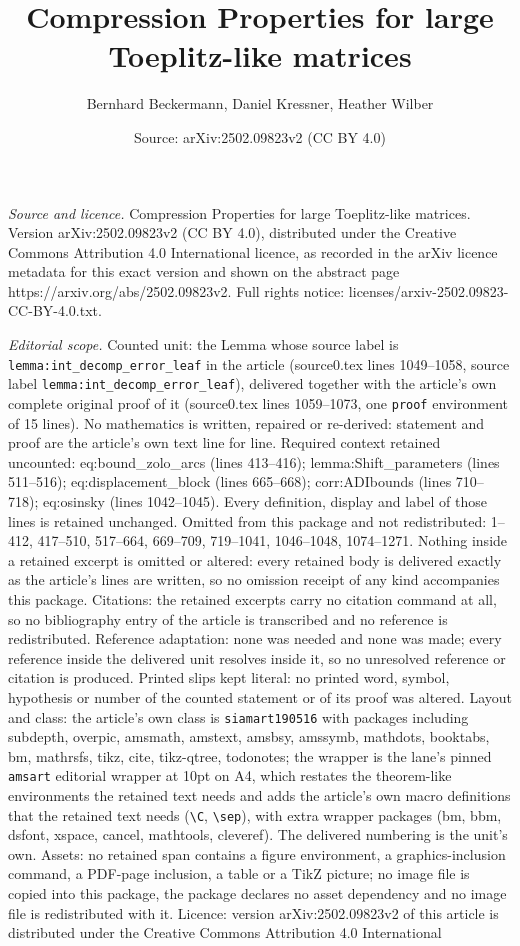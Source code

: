 \documentclass[10pt,a4paper]{amsart}
\title[Compression Properties for large Toeplitz-like matrices]{Compression Properties for large Toeplitz-like matrices}
\author{Bernhard Beckermann, Daniel Kressner, Heather Wilber}
\date{Source: arXiv:2502.09823v2 (CC BY 4.0)}
\begin{document}
\maketitle

\noindent\emph{Source and licence.} Compression Properties for large Toeplitz-like matrices. Version arXiv:2502.09823v2 (CC BY 4.0), distributed under the Creative Commons Attribution 4.0 International licence, as recorded in the arXiv licence metadata for this exact version and shown on the abstract page https://arxiv.org/abs/2502.09823v2. Full rights notice: licenses/arxiv-2502.09823-CC-BY-4.0.txt.\par\smallskip

\noindent\textit{Editorial scope.} Counted unit: the Lemma whose source label is \texttt{lemma:int\_decomp\_error\_leaf} in the article (source0.tex lines 1049--1058, source label \texttt{lemma:int\_decomp\_error\_leaf}), delivered together with the article's own complete original proof of it (source0.tex lines 1059--1073, one \texttt{proof} environment of 15 lines). No mathematics is written, repaired or re-derived: statement and proof are the article's own text line for line. Required context retained uncounted: eq:bound\_zolo\_arcs (lines 413--416); lemma:Shift\_parameters (lines 511--516); eq:displacement\_block (lines 665--668); corr:ADIbounds (lines 710--718); eq:osinsky (lines 1042--1045). Every definition, display and label of those lines is retained unchanged. Omitted from this package and not redistributed: 1--412, 417--510, 517--664, 669--709, 719--1041, 1046--1048, 1074--1271. Nothing inside a retained excerpt is omitted or altered: every retained body is delivered exactly as the article's lines are written, so no omission receipt of any kind accompanies this package. Citations: the retained excerpts carry no citation command at all, so no bibliography entry of the article is transcribed and no reference is redistributed. Reference adaptation: none was needed and none was made; every reference inside the delivered unit resolves inside it, so no unresolved reference or citation is produced. Printed slips kept literal: no printed word, symbol, hypothesis or number of the counted statement or of its proof was altered. Layout and class: the article's own class is \texttt{siamart190516} with packages including subdepth, overpic, amsmath, amstext, amsbsy, amssymb, mathdots, booktabs, bm, mathrsfs, tikz, cite, tikz-qtree, todonotes; the wrapper is the lane's pinned \texttt{amsart} editorial wrapper at 10pt on A4, which restates the theorem-like environments the retained text needs and adds the article's own macro definitions that the retained text needs (\texttt{\textbackslash C}, \texttt{\textbackslash sep}), with extra wrapper packages (bm, bbm, dsfont, xspace, cancel, mathtools, cleveref). The delivered numbering is the unit's own. Assets: no retained span contains a figure environment, a graphics-inclusion command, a PDF-page inclusion, a table or a TikZ picture; no image file is copied into this package, the package declares no asset dependency and no image file is redistributed with it. Licence: version arXiv:2502.09823v2 of this article is distributed under the Creative Commons Attribution 4.0 International 
\end{document}
